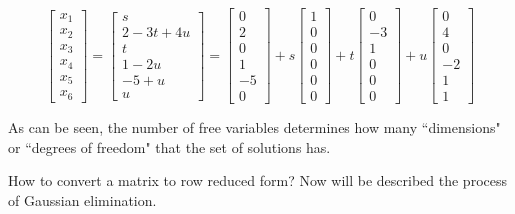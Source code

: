 \documentclass{article}
\begin{document}
\[\begin{bmatrix} x_1 \\ x_2 \\ x_3 \\ x_4 \\ x_5 \\ x_6 \end{bmatrix} = \begin{bmatrix} s \\ 2 - 3t + 4u \\ t \\ 1 - 2u \\ -5 + u \\ u \end{bmatrix} 
= \begin{bmatrix} 0 \\ 2 \\ 0 \\ 1 \\ -5 \\ 0 \end{bmatrix} + s\begin{bmatrix} 1 \\ 0 \\ 0 \\ 0 \\ 0 \\ 0 \end{bmatrix} + t\begin{bmatrix} 0 \\ -3 \\ 1 \\ 0 \\ 0 \\ 0 \end{bmatrix} + u\begin{bmatrix} 0 \\ 4 \\ 0 \\ -2 \\ 1 \\ 1 \end{bmatrix}\] 

As can be seen, the number of free variables determines how many ``dimensions" or ``degrees of freedom" that the set of solutions has.

How to convert a matrix to row reduced form? Now will be described the process of Gaussian elimination.
\end{document}
